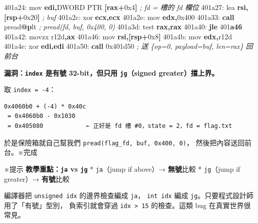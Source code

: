 \documentclass[10pt,a4paper]{article}
\newenvironment{Shaded}{\begin{snugshade}}{\end{snugshade}}
\newcommand{\BaseNTok}[1]{\textcolor[rgb]{0.00,0.00,0.81}{#1}}
\newcommand{\BuiltInTok}[1]{#1}
\newcommand{\CommentTok}[1]{\textcolor[rgb]{0.56,0.35,0.01}{\textit{#1}}}
\newcommand{\ControlFlowTok}[1]{\textcolor[rgb]{0.13,0.29,0.53}{\textbf{#1}}}
\newcommand{\DataTypeTok}[1]{\textcolor[rgb]{0.13,0.29,0.53}{#1}}
\newcommand{\DecValTok}[1]{\textcolor[rgb]{0.00,0.00,0.81}{#1}}
\newcommand{\ErrorTok}[1]{\textcolor[rgb]{0.64,0.00,0.00}{\textbf{#1}}}
\newcommand{\FunctionTok}[1]{\textcolor[rgb]{0.13,0.29,0.53}{\textbf{#1}}}
\newcommand{\KeywordTok}[1]{\textcolor[rgb]{0.13,0.29,0.53}{\textbf{#1}}}
\newcommand{\NormalTok}[1]{#1}
\newcommand{\OperatorTok}[1]{\textcolor[rgb]{0.81,0.36,0.00}{\textbf{#1}}}
\renewenvironment{Shaded}{%
  \def\FrameCommand{\fboxsep=3.2pt\colorbox{shadecolor}}%
  \MakeFramed{\advance\hsize-\width\FrameRestore\small}%
}{%
  \endMakeFramed
}
\renewenvironment{quote}{%
  \begin{mdframed}[linewidth=0pt,innerleftmargin=0pt,innerrightmargin=0pt,
    innerbottommargin=0pt,innertopmargin=0pt,skipabove=0.55em,skipbelow=0.55em,
    leftmargin=0.9em,rightmargin=0.4em,startcode={\color{quotebar}\vrule width 2.6pt},%
    endcode={}]%
  \itshape\color{black}%
}{%
  \end{mdframed}%
}
\begin{document}
\begin{Shaded}
\begin{Highlighting}[]
\NormalTok{401a24:  }\BuiltInTok{mov}  \KeywordTok{edi}\OperatorTok{,}\DataTypeTok{DWORD} \DataTypeTok{PTR} \OperatorTok{[}\KeywordTok{rax}\OperatorTok{+}\BaseNTok{0x4}\OperatorTok{]}    \CommentTok{; fd = 槽的 fd 欄位}
\NormalTok{401a27:  }\BuiltInTok{lea}  \KeywordTok{rsi}\OperatorTok{,[}\KeywordTok{rsp}\OperatorTok{+}\BaseNTok{0x20}\OperatorTok{]}             \CommentTok{; buf}
\NormalTok{401a2c:  }\BuiltInTok{xor}  \KeywordTok{ecx}\OperatorTok{,}\KeywordTok{ecx}
\NormalTok{401a2e:  }\BuiltInTok{mov}  \KeywordTok{edx}\OperatorTok{,}\BaseNTok{0x400}
\NormalTok{401a33:  }\ControlFlowTok{call}\NormalTok{ pread}\FunctionTok{@}\ErrorTok{p}\NormalTok{lt                  }\CommentTok{; pread(fd, buf, 0x400, 0)}
\NormalTok{401a3d:  }\BuiltInTok{test} \KeywordTok{rax}\OperatorTok{,}\KeywordTok{rax}
\NormalTok{401a40:  }\ControlFlowTok{jle}  \DecValTok{401}\ErrorTok{a46}
\NormalTok{401a42:  }\BuiltInTok{movzx}\NormalTok{ r12d}\OperatorTok{,}\KeywordTok{ax}
\NormalTok{401a46:  }\BuiltInTok{mov}  \KeywordTok{rsi}\OperatorTok{,[}\KeywordTok{rsp}\OperatorTok{+}\BaseNTok{0x8}\OperatorTok{]}
\NormalTok{401a4b:  }\BuiltInTok{mov}  \KeywordTok{edx}\OperatorTok{,}\NormalTok{r12d}
\NormalTok{401a4e:  }\BuiltInTok{xor}  \KeywordTok{edi}\OperatorTok{,}\KeywordTok{edi}
\NormalTok{401a50:  }\ControlFlowTok{call} \BaseNTok{0x401d50}                   \CommentTok{; 送 \{op=0, payload=buf, len=rax\} 回前台}
\end{Highlighting}
\end{Shaded}

\textbf{漏洞：\texttt{index} 是有號 32-bit，但只用 \texttt{jg}（signed
greater）擋上界。}

取 \texttt{index\ \allowbreak{}=\ \allowbreak{}-\allowbreak{}4}：

\begin{Verbatim}[breaklines=true,breakanywhere=true,breakautoindent=false,fontsize=\fontsize{7.0}{9.5}\selectfont]
0x4060b0 + (-4) * 0x40c
 = 0x4060b0 - 0x1030
 = 0x405080            ← 正好是 fd 槽 #0，state = 2，fd = flag.txt
\end{Verbatim}

於是保險箱就自己幫我們 \texttt{pread(flag\_\allowbreak{}fd,\allowbreak{}\ \allowbreak{}buf,\allowbreak{}\ \allowbreak{}0x400,\allowbreak{}\ \allowbreak{}0)}，
然後把內容送回前台。※完成

\begin{quote}
※提示 \textbf{教學重點：\texttt{ja} vs \texttt{jg}} * \texttt{ja}（jump
if above）→ \textbf{無號}比較 * \texttt{jg}（jump if greater）→
\textbf{有號}比較

編譯器把 \texttt{unsigned\ \allowbreak{}idx} 的邊界檢查編成 \texttt{ja}，
\texttt{int\ \allowbreak{}idx} 編成 \texttt{jg}。只要程式設計師用了「有號」型別，
負索引就會穿過 \texttt{idx\ \allowbreak{}\textgreater{}\allowbreak{}\ \allowbreak{}15} 的檢查。這類 bug
在真實世界很常見。
\end{quote}
\end{document}
